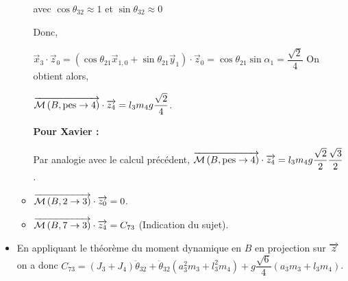 \documentclass[10pt,fleqn]{article} %
\begin{document}
\begin{itemize}
\begin{itemize}
avec $\cos\theta_{32}\approx 1$ et $\sin\theta_{32}\approx 0$

 Donc, 
 
 $\overrightarrow{x}_3\cdot \overrightarrow{z}_0=\left(\cos\theta_{21}\overrightarrow{x}_{1,0}+\sin\theta_{21}\overrightarrow{y}_1\right)\cdot \overrightarrow{z}_0=\cos\theta_{21}\sin\alpha_1=\dfrac{\sqrt{2}}{4}$
 On obtient alors,
 
 $\overrightarrow{\mathcal{M}\left( {B}, {\text{pes}} \rightarrow {4}\right)}\cdot \overrightarrow{z_4} = l_3 m_4g  \dfrac{\sqrt{2}}{4}$.

\textbf{Pour Xavier : }

Par analogie avec le calcul précédent, $\overrightarrow{\mathcal{M}\left( {B}, {\text{pes}} \rightarrow {4}\right)}\cdot \overrightarrow{z_4} = l_3 m_4g  \dfrac{\sqrt{2}}{2} \dfrac{\sqrt{3}}{2} $.





\item $\overrightarrow{\mathcal{M}\left( {B}, {2} \rightarrow {3}\right)}\cdot \overrightarrow{z_0}=0$.
\item $\overrightarrow{\mathcal{M}\left( {B}, {7} \rightarrow {3}\right)}\cdot \overrightarrow{z_4}=C_{73}$ (Indication du sujet).
\end{itemize}
\item En appliquant le théorème du moment dynamique en $B$ en projection sur $\overrightarrow{z}$ on a donc 
$ C_{73} =  \left(J_3+J_4\right) \ddot{\theta}_{32}+\ddot{\theta}_{32}\left( a_3^2 m_3  +l_3^2 m_4  \right) + g  \dfrac{\sqrt{6}}{4} \left( a_3 m_3 + l_3 m_4\right) $.
\end{itemize}
\end{document}
